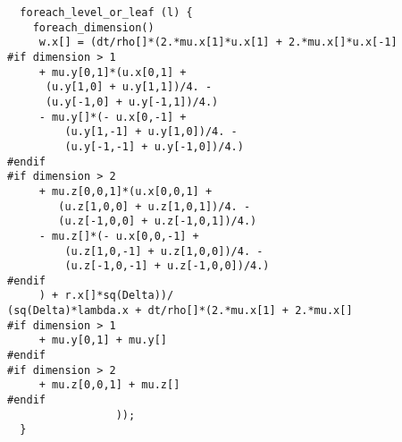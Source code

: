 \documentclass[a4paper]{article}
\newcommand{\para}[1]{\textbf{\emph{\textcolor{para}{#1}}}}
\begin{document}
\begin{center}
\end{center}
\newpage
\begin{multicols}{2}
  \columnbreak
  \begin{verbatim}
  foreach_level_or_leaf (l) {
    foreach_dimension()
     w.x[] = (dt/rho[]*(2.*mu.x[1]*u.x[1] + 2.*mu.x[]*u.x[-1]
#if dimension > 1
     + mu.y[0,1]*(u.x[0,1] +
      (u.y[1,0] + u.y[1,1])/4. -
      (u.y[-1,0] + u.y[-1,1])/4.)
     - mu.y[]*(- u.x[0,-1] +
         (u.y[1,-1] + u.y[1,0])/4. -
         (u.y[-1,-1] + u.y[-1,0])/4.)
#endif
#if dimension > 2
     + mu.z[0,0,1]*(u.x[0,0,1] +
        (u.z[1,0,0] + u.z[1,0,1])/4. -
        (u.z[-1,0,0] + u.z[-1,0,1])/4.)
     - mu.z[]*(- u.x[0,0,-1] +
         (u.z[1,0,-1] + u.z[1,0,0])/4. -
         (u.z[-1,0,-1] + u.z[-1,0,0])/4.)
#endif
     ) + r.x[]*sq(Delta))/
(sq(Delta)*lambda.x + dt/rho[]*(2.*mu.x[1] + 2.*mu.x[]
#if dimension > 1
     + mu.y[0,1] + mu.y[]
#endif
#if dimension > 2
     + mu.z[0,0,1] + mu.z[]
#endif
			     ));
  }
  \end{verbatim}
\end{multicols}

\begin{center}
\end{center}
\end{document}
